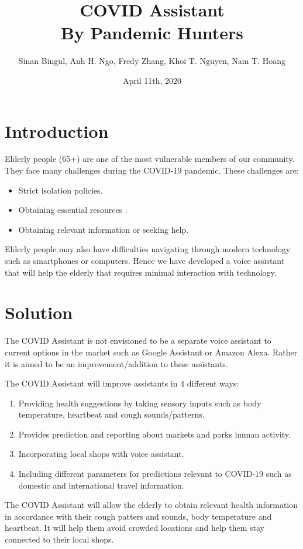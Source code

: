 \documentclass{article}
\title{
{\Huge\bf COVID Assistant\\}
{\LARGE By Pandemic Hunters}
}
\author{\small Sinan Bingul, Anh H. Ngo, Fredy Zhang, Khoi T. Nguyen, Nam T. Hoang}
\date{April 11th, 2020}
\begin{document}
\maketitle

\section*{Introduction}
Elderly people (65+) are one of the most vulnerable members of our community. They face many challenges during the COVID-19 pandemic. These challenges are;

\begin{itemize}
    \item Strict isolation policies.
    \item Obtaining essential resources .
    \item Obtaining relevant information or seeking help.
\end{itemize}


Elderly people may also have difficulties navigating through modern technology such as smartphones or computers. Hence we have developed a voice assistant that will help the elderly that requires minimal interaction with technology.


\section*{Solution}
The COVID Assistant is not envisioned to be a separate voice assistant to current options in the market such as Google Assistant or Amazon Alexa. Rather it is aimed to be an improvement/addition to these assistants.
 
The COVID Assistant will improve assistants in 4 different ways:
\begin{enumerate}
    \item Providing health suggestions by taking sensory inputs such as body temperature, heartbeat and cough sounds/patterns.
    \item Provides prediction and reporting about markets and parks human activity.
    \item Incorporating local shops with voice assistant.
    \item Including different parameters for predictions relevant to COVID-19 such as domestic and international travel information.
\end{enumerate}


The COVID Assistant will allow the elderly to obtain relevant health information in accordance with their cough patters and sounds, body temperature and heartbeat. It will help them avoid crowded locations and help them stay connected to their local shops.
\end{document}
